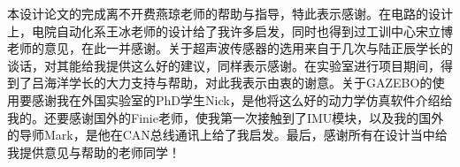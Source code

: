 
\begin{thanks}
  本设计论文的完成离不开费燕琼老师的帮助与指导，特此表示感谢。在电路的设计上，电院自动化系王冰老师的设计给了我许多启发，同时也得到过工训中心宋立博老师的意见，在此一并感谢。关于超声波传感器的选用来自于几次与陆正辰学长的谈话，对其能给我提供这么好的建议，同样表示感谢。在实验室进行项目期间，得到了吕海洋学长的大力支持与帮助，对此我表示由衷的谢意。关于GAZEBO的使用要感谢我在外国实验室的PhD学生Nick，是他将这么好的动力学仿真软件介绍给我的。还要感谢国外的Finie老师，使我第一次接触到了IMU模块，以及我的国外的导师Mark，是他在CAN总线通讯上给了我启发。最后，感谢所有在设计当中给我提供意见与帮助的老师同学！
  
\end{thanks}

